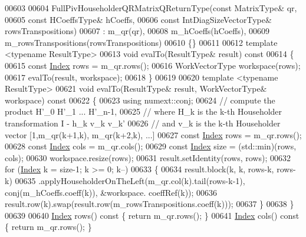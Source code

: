 \begin{DoxyCode}
00603 
00604   FullPivHouseholderQRMatrixQReturnType(\textcolor{keyword}{const} MatrixType&       qr,
00605                                         \textcolor{keyword}{const} HCoeffsType&      hCoeffs,
00606                                         \textcolor{keyword}{const} IntDiagSizeVectorType& rowsTranspositions)
00607     : m\_qr(qr),
00608       m\_hCoeffs(hCoeffs),
00609       m\_rowsTranspositions(rowsTranspositions)
00610   \{\}
00611 
00612   \textcolor{keyword}{template} <\textcolor{keyword}{typename} ResultType>
00613   \textcolor{keywordtype}{void} evalTo(ResultType& result)\textcolor{keyword}{ const}
00614 \textcolor{keyword}{  }\{
00615     \textcolor{keyword}{const} \hyperlink{namespace_eigen_a62e77e0933482dafde8fe197d9a2cfde}{Index} rows = m\_qr.rows();
00616     WorkVectorType workspace(rows);
00617     evalTo(result, workspace);
00618   \}
00619 
00620   \textcolor{keyword}{template} <\textcolor{keyword}{typename} ResultType>
00621   \textcolor{keywordtype}{void} evalTo(ResultType& result, WorkVectorType& workspace)\textcolor{keyword}{ const}
00622 \textcolor{keyword}{  }\{
00623     \textcolor{keyword}{using} numext::conj;
00624     \textcolor{comment}{// compute the product H'\_0 H'\_1 ... H'\_n-1,}
00625     \textcolor{comment}{// where H\_k is the k-th Householder transformation I - h\_k v\_k v\_k'}
00626     \textcolor{comment}{// and v\_k is the k-th Householder vector [1,m\_qr(k+1,k), m\_qr(k+2,k), ...]}
00627     \textcolor{keyword}{const} \hyperlink{namespace_eigen_a62e77e0933482dafde8fe197d9a2cfde}{Index} rows = m\_qr.rows();
00628     \textcolor{keyword}{const} \hyperlink{namespace_eigen_a62e77e0933482dafde8fe197d9a2cfde}{Index} cols = m\_qr.cols();
00629     \textcolor{keyword}{const} \hyperlink{namespace_eigen_a62e77e0933482dafde8fe197d9a2cfde}{Index} size = (std::min)(rows, cols);
00630     workspace.resize(rows);
00631     result.setIdentity(rows, rows);
00632     \textcolor{keywordflow}{for} (\hyperlink{namespace_eigen_a62e77e0933482dafde8fe197d9a2cfde}{Index} k = size-1; k >= 0; k--)
00633     \{
00634       result.block(k, k, rows-k, rows-k)
00635             .applyHouseholderOnTheLeft(m\_qr.col(k).tail(rows-k-1), conj(m\_hCoeffs.coeff(k)), &workspace.
      coeffRef(k));
00636       result.row(k).swap(result.row(m\_rowsTranspositions.coeff(k)));
00637     \}
00638   \}
00639 
00640   \hyperlink{namespace_eigen_a62e77e0933482dafde8fe197d9a2cfde}{Index} rows()\textcolor{keyword}{ const }\{ \textcolor{keywordflow}{return} m\_qr.rows(); \}
00641   \hyperlink{namespace_eigen_a62e77e0933482dafde8fe197d9a2cfde}{Index} cols()\textcolor{keyword}{ const }\{ \textcolor{keywordflow}{return} m\_qr.rows(); \}

\end{DoxyCode}
